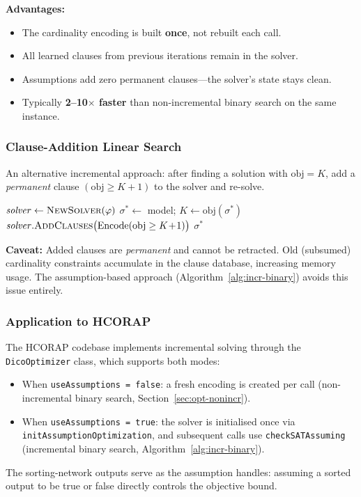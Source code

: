 \documentclass[11pt,a4paper]{article}
\begin{document}
\textbf{Advantages:}
\begin{itemize}
    \item The cardinality encoding is built \textbf{once}, not rebuilt each call.
    \item All learned clauses from previous iterations remain in the solver.
    \item Assumptions add zero permanent clauses---the solver's state stays clean.
    \item Typically \textbf{2--10$\times$ faster} than non-incremental binary
          search on the same instance.
\end{itemize}

\subsubsection{Clause-Addition Linear Search}

An alternative incremental approach: after finding a solution with
$\mathrm{obj} = K$, add a \emph{permanent} clause
$(\mathrm{obj} \ge K\!+\!1)$ to the solver and re-solve.

\begin{algorithm}[H]
\caption{Incremental Linear Search with Clause Addition (maximisation)}
\label{alg:incr-linear}
\begin{algorithmic}[1]
\State $\mathit{solver} \leftarrow \textsc{NewSolver}(\varphi)$
    \State $\sigma^* \leftarrow$ model;\;\;
           $K \leftarrow \mathrm{obj}(\sigma^*)$
    \State $\mathit{solver}.\textsc{AddClauses}\bigl(\mathrm{Encode}(\mathrm{obj} \ge K\!+\!1)\bigr)$
\EndWhile
\State \Return $\sigma^*$     
\end{algorithmic}
\end{algorithm}

\textbf{Caveat:} Added clauses are \emph{permanent} and cannot be retracted.
Old (subsumed) cardinality constraints accumulate in the clause database,
increasing memory usage.  The assumption-based approach
(Algorithm~\ref{alg:incr-binary}) avoids this issue entirely.

\subsubsection{Application to HCORAP}

The HCORAP codebase implements incremental solving through the
\texttt{DicoOptimizer} class, which supports both modes:
\begin{itemize}
    \item When \texttt{useAssumptions = false}: a fresh encoding is created per
          call (non-incremental binary search, Section~\ref{sec:opt-nonincr}).
    \item When \texttt{useAssumptions = true}: the solver is initialised once
          via \texttt{initAssumptionOptimization}, and subsequent calls use
          \texttt{checkSATAssuming} (incremental binary search,
          Algorithm~\ref{alg:incr-binary}).
\end{itemize}
The sorting-network outputs serve as the assumption handles: assuming a sorted
output to be true or false directly controls the objective bound.
\end{document}
